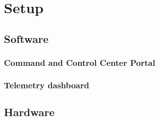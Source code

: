 
\chapter{Setup}


\section{Software}

\subsection{Command and Control Center Portal}

\subsection{Telemetry dashboard}

\section{Hardware}


